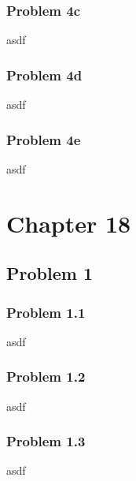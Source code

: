 \documentclass{article}
\begin{document}
\subsubsection{Problem 4c}
asdf

\subsubsection{Problem 4d}
asdf

\subsubsection{Problem 4e}
asdf


\newpage
\section{\textbf{Chapter 18}}
\subsection{Problem 1}
\subsubsection{Problem 1.1}
asdf


\subsubsection{Problem 1.2}
asdf


\subsubsection{Problem 1.3}
asdf
\end{document}

